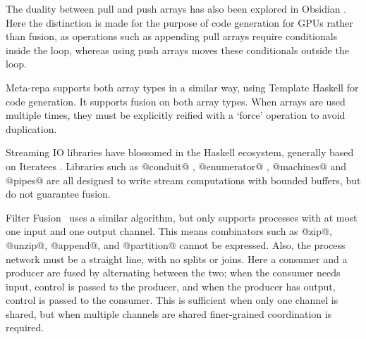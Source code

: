 
The duality between pull and push arrays has also been explored in Obsidian \cite{claessen2012expressive, svensson2014defunctionalizing}. Here the distinction is made for the purpose of code generation for GPUs rather than fusion, as operations such as appending pull arrays require conditionals inside the loop, whereas using push arrays moves these conditionals outside the loop.

Meta-repa \cite{ankner2013edsl} supports both array types in a similar way, using Template Haskell for code generation. It supports fusion on both array types. When arrays are used multiple times, they must be explicitly reified with a `force' operation to avoid duplication.


Streaming IO libraries have blossomed in the Haskell ecosystem, generally based on Iteratees \cite{kiselyov2012iteratees}. Libraries such as @conduit@ \cite{hackage:conduit}, @enumerator@ \cite{hackage:enumerator}, @machines@ \cite{hackage:machines} and @pipes@ \cite{hackage:pipes} are all designed to write stream computations with bounded buffers, but do not guarantee fusion.



Filter Fusion~\cite{proebsting1996filter} uses a similar algorithm, but only supports processes with at most one input and one output channel.
This means combinators such as @zip@, @unzip@, @append@, and @partition@ cannot be expressed.
Also, the process network must be a straight line, with no splits or joins.
Here a consumer and a producer are fused by alternating between the two; when the consumer needs input, control is passed to the producer, and when the producer has output, control is passed to the consumer.
This is sufficient when only one channel is shared, but when multiple channels are shared finer-grained coordination is required.


